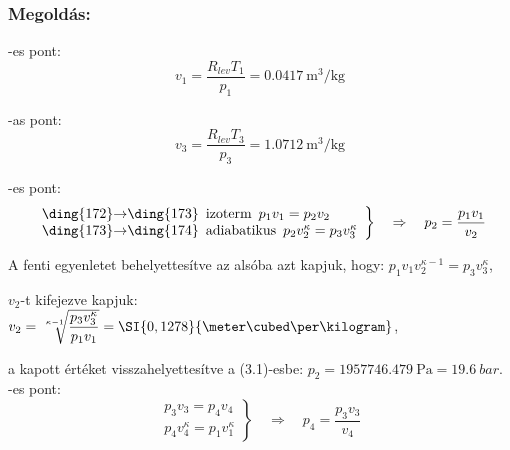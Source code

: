 \noindent\hrulefill

\subsubsection{Megoldás:}

\noindent{}-es pont:
\begin{equation*}
	v_1 = \dfrac{R_{lev}T_1}{p_1}=\SI{0,0417}{\meter\cubed\per\kilogram}
\end{equation*}

\noindent{}-as pont:
\begin{equation*}
	v_3 = \dfrac{R_{lev}T_3}{p_3}=\SI{1,0712}{\meter\cubed\per\kilogram}
\end{equation*}

\noindent{}-es pont:
\begin{equation}
	\left.
	\begin{array}{lcl}
	$\ding{172}$\rightarrow$\ding{173}$\enspace $izoterm$\enspace p_1 v_1 = p_2 v_2\\
	$\ding{173}$\rightarrow$\ding{174}$\enspace $adiabatikus$\enspace p_2 		v_2^\kappa = p_3 v_3^\kappa
	\end{array}
	\right\rbrace
	\quad \Rightarrow \quad  
	p_2 = \dfrac{p_1 v_1}{v_2}
\end{equation}

\par A fenti egyenletet behelyettesítve az alsóba azt kapjuk, hogy: $p_1 v_1 v_2^{\kappa-1} = p_3v_3^\kappa$,\\

\par $v_2$-t kifejezve kapjuk: $v_2=\sqrt[\leftroot{-2}\uproot{2}{\kappa-1}]{\dfrac{p_3v_3^\kappa}{p_1 v_1}}=\SI{0,1278}{\meter\cubed\per\kilogram}$,\\

\par a kapott értéket visszahelyettesítve a (3.1)-esbe: $p_2=\SI{1957746,479}{\pascal}=\SI{19,6}{bar}$.
\newline\\

\noindent{}-es pont:
\begin{equation}
	\left.
	\begin{array}{lcl}
	p_3 v_3 = p_4 v_4\\
	p_4 v_4^\kappa = p_1 v_1^\kappa
	\end{array}
	\right\rbrace
	\quad \Rightarrow \quad  
	p_4 = \dfrac{p_3 v_3}{v_4}
\end{equation}

